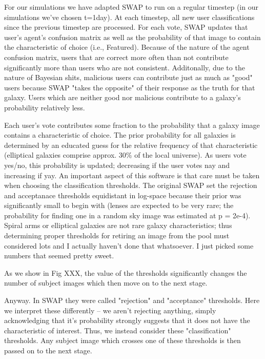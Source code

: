\documentclass[twocolumn]{aastex6}
\begin{document}
For our simulations we have adapted SWAP to run on a regular timestep (in our simulations we've chosen t=1day). At each timestep, all new user classifications since the previous timestep are processed. For each vote, SWAP updates that user's agent's confusion matrix as well as the probability of that image to contain the characteristic of choice (i.e., Featured). Because of the nature of the agent confusion matrix,  users that are correct more often than not contribute significantly more than users who are not consistent. Additonally, due to the nature of Bayesian shits, malicious users can contribute just as much as "good" users because SWAP "takes the opposite" of their response as the truth for that galaxy. Users which are neither good nor malicious contribute to a galaxy's probability relatively less.

Each user's vote contributes some fraction to the probability that a galaxy image contains a characteristic of choice. The prior probability for all galaxies is determined by an educated guess for the relative frequency of that characteristic (elliptical galaxies comprise approx. 30\% of the local universe). As users vote yes/no, this probability is updated; decreasing if the user votes nay and increasing if yay. An important aspect of this software is that care must be taken when choosing the classification thresholds. The original SWAP set the rejection and acceptanace thresholds equidistant in log-space because their prior was significantly small to begin with (lenses are expected to be very rare; the probability for finding one in a random sky image was estimated at p = 2e-4).  Spiral arms or elliptical galaxies are not rare galaxy characteristics; thus determining proper thresholds for retiring an image from the pool must considered lots and I actually haven't done that whatsoever. I just picked some numbers that seemed pretty sweet. 

As we show in Fig XXX, the value of the thresholds significantly changes the number of subject images which then move on to the next stage. 

Anyway. In SWAP they were called "rejection" and "acceptance" thresholds. Here we interpret these differently  -- we aren't rejecting anything, simply acknowledging that it's probability strongly suggests that it does not have the characteristic of interest. Thus, we instead consider these "classification" thresholds. Any subject image which crosses one of these thresholds is then passed on to the next stage. 
\end{document}

